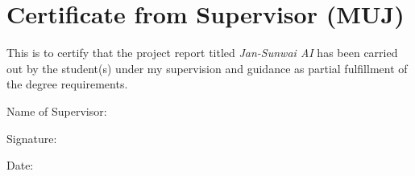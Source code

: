 \chapter*{Certificate from Supervisor (MUJ)}

This is to certify that the project report titled \textit{Jan-Sunwai AI} has been carried out by the student(s) under my supervision and guidance as partial fulfillment of the degree requirements.

\vspace{2cm}
\noindent Name of Supervisor: \hrulefill

\vspace{1cm}
\noindent Signature: \hrulefill

\vspace{1cm}
\noindent Date: \hrulefill
